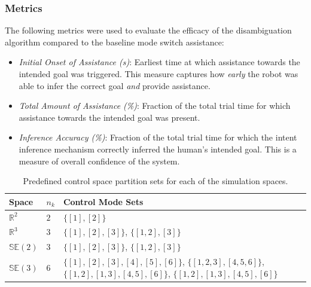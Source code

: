 \documentclass[conference]{IEEEtran}
\begin{document}
\subsubsection{Metrics}
The following metrics were used to evaluate the efficacy of the disambiguation algorithm compared to the baseline mode switch assistance:
\begin{itemize}
	\item \textit{Initial Onset of Assistance (s)}: Earliest time at which assistance towards the intended goal was triggered. This measure captures how \textit{early} the robot was able to infer the correct goal  \textit{and} provide assistance. 
	\item \textit{Total Amount of Assistance (\%)}: Fraction of the total trial time for which assistance towards the intended goal was present.  
	\item \textit{Inference Accuracy (\%)}: Fraction of the total trial time for which the intent inference mechanism correctly inferred the human's intended goal. This is a measure of overall confidence of the system. 
\end{itemize}
\begin{table}[t]
	\centering
	\begin{tabular}{|p{1cm}|p{0.5cm}|p{3cm}|}
		\hline
		\textbf{Space} & $n_k$ &\textbf{Control Mode Sets}  \\ \hline
		$\mathbb{R}^2$ & $2$ & $\{[1],[2]\}$ \\ \hline
		$\mathbb{R}^3$ & $3$ & $\{[1],[2], [3]\}$, $\{[1,2], [3]\}$ \\ \hline
		$\mathbb{SE}(2)$ & $3$ &  $\{[1],[2],[3]\}$, $\{[1,2], [3]\}$ \\ \hline
		$\mathbb{SE}(3)$ & $6$ & $\{[1],[2],[3],[4],[5],[6]\}$, $\{[1,2,3],  [4,5,6]\}$, $\{[1,2], [1,3], [4,5], [6]\}$, $\{[1,2], [1,3], [4,5], [6]\}$ \\ \hline
	\end{tabular}
	\vspace{.2cm}
	\caption{Predefined control space partition sets for each of the simulation spaces.} 
	\label{tbl:cmp}
	\vspace{-.5cm}
\end{table}
\end{document}
